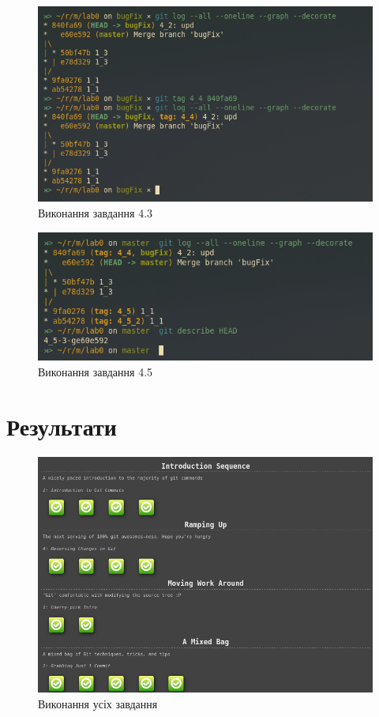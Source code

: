 \documentclass[oneside,14pt]{extarticle}
\begin{document}
\begin{normalsize}
		\begin{figure}[H]
			\centering
			\includegraphics[scale=0.6]{4_3}
			\caption{Виконання завдання 4.3}
		\end{figure}
		\begin{figure}[H]
			\centering
			\includegraphics[scale=0.6]{4_5}
			\caption{Виконання завдання 4.5}
		\end{figure}
		
	\section*{Результати}
		\begin{figure}[H]
			\centering
			\includegraphics[scale=0.6]{1}
			\caption{Виконання усіх завдання}
		\end{figure}

\end{normalsize}
\end{document}
